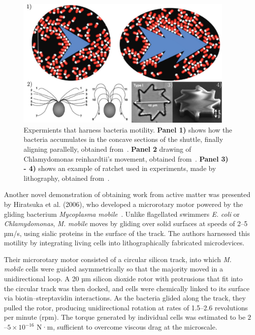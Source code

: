  \begin{figure}[h]
  \begin{center}
    \includegraphics[width=0.95\textwidth]{figures/harnessWork.pdf}
  \end{center}
  \caption[Experiments that harness bacteria motility.]{Expermients that harness bacteria motility. \textbf{Panel 1)} shows how the bacteria accumulates in the concave sections of the shuttle, finally aligning parallelly, obtained from~\cite{angelani2010geometrically}. \textbf{Panel 2} drawing of Chlamydomonas reinhardtii's movement, obtained from~\cite{weibel2005microoxen}. \textbf{Panel 3) - 4)} shows an example of ratchet used in experiments, made by lithography, obtained from~\cite{di2010bacterial}.}\label{fig:harnesswork}
\end{figure}

Another novel demonstration of obtaining work from active matter was presented by Hiratsuka et al. (2006), who developed a microrotary motor powered by the gliding bacterium \textit{Mycoplasma mobile}~\cite{hiratsuka2006microrotary}. Unlike flagellated swimmers \textit{E. coli} or \textit{Chlamydomonas}, \textit{M. mobile} moves by gliding over solid surfaces at speeds of 2–5 µm/s, using sialic proteins in the surface of the track. The authors harnessed this motility by integrating living cells into lithographically fabricated microdevices.

Their microrotary motor consisted of a circular silicon track, into which \textit{M. mobile} cells were guided asymmetrically so that the majority moved in a unidirectional loop. A 20 µm silicon dioxide rotor with protrusions that fit into the circular track was then docked, and cells were chemically linked to its surface via biotin–streptavidin interactions. As the bacteria glided along the track, they pulled the rotor, producing unidirectional rotation at rates of 1.5–2.6 revolutions per minute (rpm). The torque generated by individual cells was estimated to be $2$–$5\times10^{-16}$ N·m, sufficient to overcome viscous drag at the microscale.

